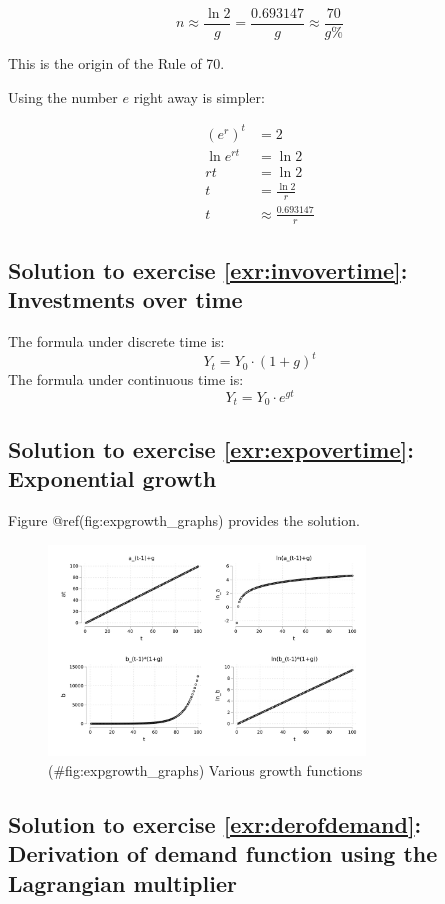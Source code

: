 \documentclass[
  12pt,
  oneside]{book}
\theoremstyle{definition}
\theoremstyle{definition}
\theoremstyle{definition}
\theoremstyle{definition}
\theoremstyle{remark}
\begin{document}
\[n \approx \frac{\ln 2}{g} = \frac{0.693147}{g} \approx \frac{70}{g\%}\]

This is the origin of the Rule of 70.

Using the number \(e\) right away is simpler:

\begin{align*}
(e^r)^t &= 2 \\
\ln e^{rt} &= \ln 2 \\
rt &= \ln 2 \\
t &= \frac{\ln 2}{r} \\
t &\approx \frac{0.693147}{r}
\end{align*}

\hypertarget{sol:invovertime}{%
\subsection*{Solution to exercise \ref{exr:invovertime}: Investments over time}\label{sol:invovertime}}

The formula under discrete time is:
\[
Y_t=Y_0\cdot (1+g)^t
\]
The formula under continuous time is:
\[
Y_t=Y_0\cdot e^{gt}
\]

\hypertarget{sol:expovertime}{%
\subsection*{Solution to exercise \ref{exr:expovertime}: Exponential growth}\label{sol:expovertime}}

Figure @ref(fig:expgrowth\_graphs) provides the solution.

\begin{figure}
\centering
\includegraphics[width=0.75\textwidth,height=\textheight]{fig/expgrowth_graphs.png}
\caption{(\#fig:expgrowth\_graphs) Various growth functions}
\end{figure}

\hypertarget{sol:derofdemand}{%
\subsection*{Solution to exercise \ref{exr:derofdemand}: Derivation of demand function using the Lagrangian multiplier}\label{sol:derofdemand}}
\end{document}
